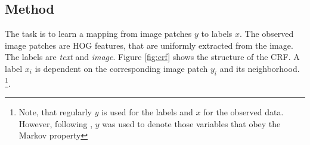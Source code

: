 \subsection{Method}
\label{subsec:imagelocmethod}


The task is to learn a mapping from image patches $y$ to labels $x$. The
observed image patches are HOG features, that are uniformly extracted from the
image.  The labels are \emph{text} and \emph{image}. Figure \ref{fig:crf} shows
the structure of the CRF. A label $x_i$ is dependent on the corresponding image
patch $y_i$ and its neighborhood.  \footnote{Note, that regularly $y$ is used
for the labels and $x$ for the observed data.  However, following
\cite{lafferty2001conditional, bishop2006pattern}, $y$ was used to denote those
variables that obey the Markov property}.

